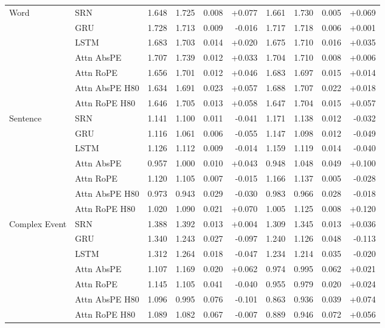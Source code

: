 \begin{longtable}{@{}llrrrrrrrr@{}}
\bottomrule
\endlastfoot
Word & SRN & 1.648 & 1.725 & 0.008 & +0.077 & 1.661 & 1.730 & 0.005 & +0.069 \\
 & GRU & 1.728 & 1.713 & 0.009 & -0.016 & 1.717 & 1.718 & 0.006 & +0.001 \\
 & LSTM & 1.683 & 1.703 & 0.014 & +0.020 & 1.675 & 1.710 & 0.016 & +0.035 \\
 & Attn AbsPE & 1.707 & 1.739 & 0.012 & +0.033 & 1.704 & 1.710 & 0.008 & +0.006 \\
 & Attn RoPE & 1.656 & 1.701 & 0.012 & +0.046 & 1.683 & 1.697 & 0.015 & +0.014 \\
 & Attn AbsPE H80 & 1.634 & 1.691 & 0.023 & +0.057 & 1.688 & 1.707 & 0.022 & +0.018 \\
 & Attn RoPE H80 & 1.646 & 1.705 & 0.013 & +0.058 & 1.647 & 1.704 & 0.015 & +0.057 \\
\addlinespace
Sentence & SRN & 1.141 & 1.100 & 0.011 & -0.041 & 1.171 & 1.138 & 0.012 & -0.032 \\
 & GRU & 1.116 & 1.061 & 0.006 & -0.055 & 1.147 & 1.098 & 0.012 & -0.049 \\
 & LSTM & 1.126 & 1.112 & 0.009 & -0.014 & 1.159 & 1.119 & 0.014 & -0.040 \\
 & Attn AbsPE & 0.957 & 1.000 & 0.010 & +0.043 & 0.948 & 1.048 & 0.049 & +0.100 \\
 & Attn RoPE & 1.120 & 1.105 & 0.007 & -0.015 & 1.166 & 1.137 & 0.005 & -0.028 \\
 & Attn AbsPE H80 & 0.973 & 0.943 & 0.029 & -0.030 & 0.983 & 0.966 & 0.028 & -0.018 \\
 & Attn RoPE H80 & 1.020 & 1.090 & 0.021 & +0.070 & 1.005 & 1.125 & 0.008 & +0.120 \\
\addlinespace
Complex Event & SRN & 1.388 & 1.392 & 0.013 & +0.004 & 1.309 & 1.345 & 0.013 & +0.036 \\
 & GRU & 1.340 & 1.243 & 0.027 & -0.097 & 1.240 & 1.126 & 0.048 & -0.113 \\
 & LSTM & 1.312 & 1.264 & 0.018 & -0.047 & 1.234 & 1.214 & 0.035 & -0.020 \\
 & Attn AbsPE & 1.107 & 1.169 & 0.020 & +0.062 & 0.974 & 0.995 & 0.062 & +0.021 \\
 & Attn RoPE & 1.145 & 1.105 & 0.041 & -0.040 & 0.955 & 0.979 & 0.020 & +0.024 \\
 & Attn AbsPE H80 & 1.096 & 0.995 & 0.076 & -0.101 & 0.863 & 0.936 & 0.039 & +0.074 \\
 & Attn RoPE H80 & 1.089 & 1.082 & 0.067 & -0.007 & 0.889 & 0.946 & 0.072 & +0.056 \\

\end{longtable}
